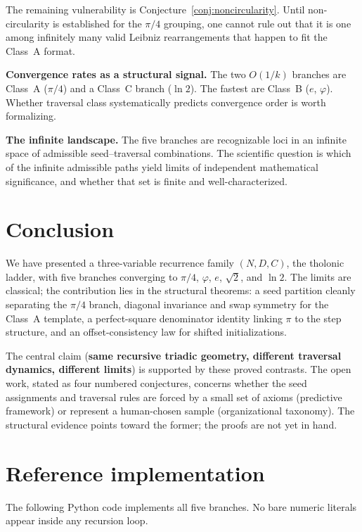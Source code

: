 \documentclass[12pt]{article}
\theoremstyle{definition}
\theoremstyle{remark}
\begin{document}
The remaining vulnerability is Conjecture~\ref{conj:noncircularity}. Until non-circularity
is established for the $\pi/4$ grouping, one cannot rule out that it is one among infinitely
many valid Leibniz rearrangements that happen to fit the Class~A format.

\textbf{Convergence rates as a structural signal.} The two $O(1/k)$ branches are Class~A
($\pi/4$) and a Class~C branch ($\ln 2$). The fastest are Class~B ($e$, $\varphi$).
Whether traversal class systematically predicts convergence order is worth formalizing.

\textbf{The infinite landscape.} The five branches are recognizable loci in an infinite
space of admissible seed--traversal combinations. The scientific question is which of the
infinite admissible paths yield limits of independent mathematical significance, and whether
that set is finite and well-characterized.

\section{Conclusion}\label{sec:conclusion}
We have presented a three-variable recurrence family $(N, D, C)$, the tholonic ladder,
with five branches converging to $\pi/4$, $\varphi$, $e$, $\sqrt{2}$, and $\ln 2$.
The limits are classical; the contribution lies in the structural theorems: a seed partition
cleanly separating the $\pi/4$ branch, diagonal invariance and swap symmetry for the
Class~A template, a perfect-square denominator identity linking $\pi$ to the step structure,
and an offset-consistency law for shifted initializations.

The central claim (\textbf{same recursive triadic geometry, different traversal dynamics,
different limits}) is supported by these proved contrasts. The open work, stated as four
numbered conjectures, concerns whether the seed assignments and traversal rules are forced
by a small set of axioms (predictive framework) or represent a human-chosen sample
(organizational taxonomy). The structural evidence points toward the former; the proofs
are not yet in hand.

\appendix
\section{Reference implementation}\label{app:impl}
The following Python code implements all five branches. No bare numeric literals appear
inside any recursion loop.
\end{document}
